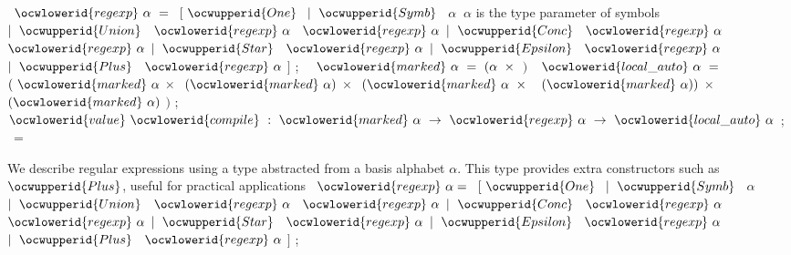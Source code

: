 \documentclass[12pt]{article}
\begin{document}
\label{../ML/regular.ml:1251}%
\ocwindent{1.00em}
~$\ocwlowerid{regexp}~\alpha{}~=~$\ocweol
\ocwindent{2.00em}
$[~\ocwupperid{One}~$\ocweol
\ocwindent{2.00em}
$\mid{}~\ocwupperid{Symb}~$~$\alpha{}~$\ocwbc{} \ocwbegindcode{}$\alpha{}$\ocwenddcode{} is the type parameter of symbols \ocwec{}\ocweol
\ocwindent{2.00em}
$\mid{}~\ocwupperid{Union}~$~$\ocwlowerid{regexp}~\alpha{}~$~$\ocwlowerid{regexp}~\alpha{}$\ocweol
\ocwindent{2.00em}
$\mid{}~\ocwupperid{Conc}~$~$\ocwlowerid{regexp}~\alpha{}~$~$\ocwlowerid{regexp}~\alpha{}$\ocweol
\ocwindent{2.00em}
$\mid{}~\ocwupperid{Star}~$~$\ocwlowerid{regexp}~\alpha{}$\ocweol
\ocwindent{2.00em}
$\mid{}~\ocwupperid{Epsilon}~$~$\ocwlowerid{regexp}~\alpha{}$\ocweol
\ocwindent{2.00em}
$\mid{}~\ocwupperid{Plus}~$~$\ocwlowerid{regexp}~\alpha{}$\ocweol
\ocwindent{2.00em}
$]$\ocweol
\ocwindent{1.00em}
;~\ocweol
\ocwindent{1.00em}
~$\ocwlowerid{marked}~\alpha{}~=~(\alpha{}~\times{}~$$)~$\ocweol
\ocwindent{1.00em}
~$\ocwlowerid{local\_auto}~\alpha{}~=~$\ocweol
\ocwindent{3.00em}
$(~\ocwlowerid{marked}~\alpha{}$\ocweol
\ocwindent{3.00em}
$\times{}~$~$(\ocwlowerid{marked}~\alpha{})$\ocweol
\ocwindent{3.00em}
$\times{}~$~$(\ocwlowerid{marked}~\alpha{}~\times{}~$~$(\ocwlowerid{marked}~\alpha{}))$\ocweol
\ocwindent{3.00em}
$\times{}~$~$(\ocwlowerid{marked}~\alpha{})$\ocweol
\ocwindent{3.00em}
$)$\ocweol
\ocwindent{1.00em}
;\ocweol
\ocwindent{1.00em}
$\ocwlowerid{value}~\ocwlowerid{compile}~:~\ocwlowerid{marked}~\alpha{}~\rightarrow{}~\ocwlowerid{regexp}~\alpha{}~\rightarrow{}~\ocwlowerid{local\_auto}~\alpha{}$\ocweol
\ocwindent{0.00em}
;\ocweol
\ocwindent{0.00em}
~=~\medskip

\ocwendcode{}\ocwindent{0.00em}
We describe regular expressions using a type abstracted from a basis 
   alphabet \ocwbegindcode{}$\alpha{}$\ocwenddcode{}. This type provides extra constructors such as \ocwbegindcode{}$\ocwupperid{Plus}$\ocwenddcode{},
   useful for practical applications 
\ocweol
\label{../ML/regular.ml:1949}%
\medskip
\ocwbegincode{}\ocwindent{1.00em}
~$\ocwlowerid{regexp}~\alpha{}=~$\ocweol
\ocwindent{2.00em}
$[~\ocwupperid{One}~$\ocweol
\ocwindent{2.00em}
$\mid{}~\ocwupperid{Symb}~$~$\alpha{}$\ocweol
\ocwindent{2.00em}
$\mid{}~\ocwupperid{Union}~$~$\ocwlowerid{regexp}~\alpha{}~$~$\ocwlowerid{regexp}~\alpha{}$\ocweol
\ocwindent{2.00em}
$\mid{}~\ocwupperid{Conc}~$~$\ocwlowerid{regexp}~\alpha{}~$~$\ocwlowerid{regexp}~\alpha{}$\ocweol
\ocwindent{2.00em}
$\mid{}~\ocwupperid{Star}~$~$\ocwlowerid{regexp}~\alpha{}$\ocweol
\ocwindent{2.00em}
$\mid{}~\ocwupperid{Epsilon}~$~$\ocwlowerid{regexp}~\alpha{}$\ocweol
\ocwindent{2.00em}
$\mid{}~\ocwupperid{Plus}~$~$\ocwlowerid{regexp}~\alpha{}$\ocweol
\ocwindent{2.00em}
$]$\ocweol
\ocwindent{1.00em}
;\medskip
\end{document}

